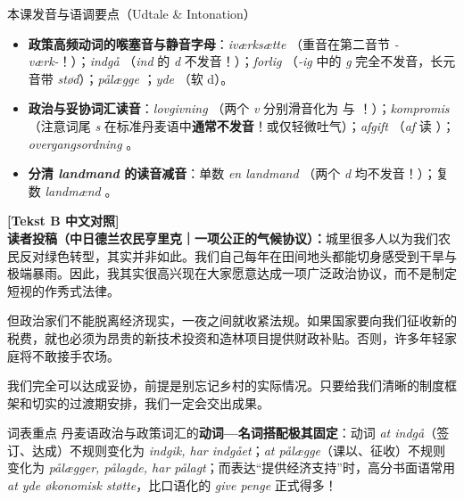 \begin{tipbox}{本课发音与语调要点（Udtale \& Intonation）}
\begin{itemize}
  \item \textbf{政策高频动词的喉塞音与静音字母}：\textit{iværksætte} （重音在第二音节 \textit{-værk-}！）；\textit{indgå} （\textit{ind} 的 \textit{d} 不发音！）；\textit{forlig} （\textit{-ig} 中的 \textit{g} 完全不发音，长元音带 \textit{stød}）；\textit{pålægge} ；\textit{yde} （软 d）。
  \item \textbf{政治与妥协词汇读音}：\textit{lovgivning} （两个 \textit{v} 分别滑音化为  与 ！）；\textit{kompromis} （注意词尾 \textit{s} 在标准丹麦语中\textbf{通常不发音}！或仅轻微吐气）；\textit{afgift} （\textit{af} 读 ）；\textit{overgangsordning} 。
  \item \textbf{分清 \textit{landmand} 的读音减音}：单数 \textit{en landmand} （两个 \textit{d} 均不发音！）；复数 \textit{landmænd} 。
\end{itemize}
\end{tipbox}

\begin{transbox}
\small
\textbf{\color{NCDTeal}[Tekst B 中文对照]}\\
\textbf{读者投稿（中日德兰农民亨里克｜一项公正的气候协议）：}城里很多人以为我们农民反对绿色转型，其实并非如此。我们自己每年在田间地头都能切身感受到干旱与极端暴雨。因此，我其实很高兴现在大家愿意达成一项广泛政治协议，而不是制定短视的作秀式法律。

但政治家们不能脱离经济现实，一夜之间就收紧法规。如果国家要向我们征收新的税费，就也必须为昂贵的新技术投资和造林项目提供财政补贴。否则，许多年轻家庭将不敢接手农场。

我们完全可以达成妥协，前提是别忘记乡村的实际情况。只要给我们清晰的制度框架和切实的过渡期安排，我们一定会交出成果。
\end{transbox}


\begin{tipbox}{词表重点}
丹麦语政治与政策词汇的\textbf{动词—名词搭配极其固定}：动词 \textit{at indgå}（签订、达成）不规则变化为 \textit{indgik, har indgået}；\textit{at pålægge}（课以、征收）不规则变化为 \textit{pålægger, pålagde, har pålagt}；而表达“提供经济支持”时，高分书面语常用 \textit{at yde økonomisk støtte}，比口语化的 \textit{give penge} 正式得多！
\end{tipbox}

